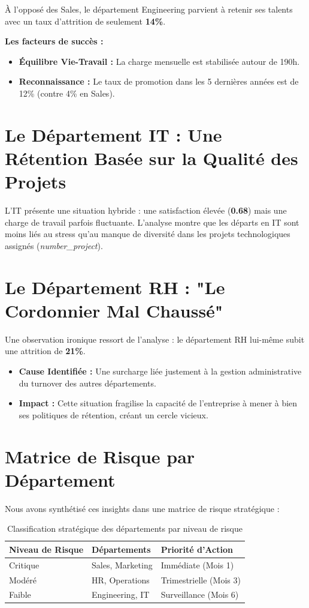 À l'opposé des Sales, le département Engineering parvient à retenir ses talents avec un taux d'attrition de seulement \textbf{14\%}.

\textbf{Les facteurs de succès :}
\begin{itemize}
    \item \textbf{Équilibre Vie-Travail :} La charge mensuelle est stabilisée autour de 190h.
    \item \textbf{Reconnaissance :} Le taux de promotion dans les 5 dernières années est de 12\% (contre 4\% en Sales).
\end{itemize}

\section{Le Département IT : Une Rétention Basée sur la Qualité des Projets}

L'IT présente une situation hybride : une satisfaction élevée (\textbf{0.68}) mais une charge de travail parfois fluctuante. L'analyse montre que les départs en IT sont moins liés au stress qu'au manque de diversité dans les projets technologiques assignés (\textit{number\_project}).

\section{Le Département RH : "Le Cordonnier Mal Chaussé"}

Une observation ironique ressort de l'analyse : le département RH lui-même subit une attrition de \textbf{21\%}.
\begin{itemize}
    \item \textbf{Cause Identifiée :} Une surcharge liée justement à la gestion administrative du turnover des autres départements.
    \item \textbf{Impact :} Cette situation fragilise la capacité de l'entreprise à mener à bien ses politiques de rétention, créant un cercle vicieux.
\end{itemize}

\section{Matrice de Risque par Département}

Nous avons synthétisé ces insights dans une matrice de risque stratégique :

\begin{table}[h]
\centering
\begin{tabular}{|l|l|l|}
\hline
\textbf{Niveau de Risque} & \textbf{Départements} & \textbf{Priorité d'Action} \\ \hline
\cellcolor[HTML]{FFCCCB}Critique & Sales, Marketing & Immédiate (Mois 1) \\ \hline
\cellcolor[HTML]{FFFFE0}Modéré & HR, Operations & Trimestrielle (Mois 3) \\ \hline
\cellcolor[HTML]{90EE90}Faible & Engineering, IT & Surveillance (Mois 6) \\ \hline
\end{tabular}
\caption{Classification stratégique des départements par niveau de risque}
\end{table}
